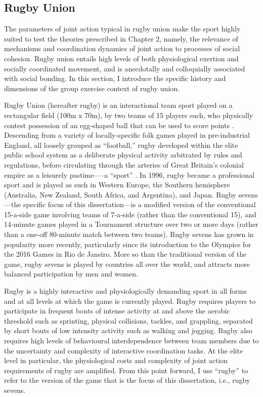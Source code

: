 \begin{CJK}{UTF8}{gbsn}
  \subsection{Rugby Union}

The parameters of joint action typical in rugby union make the sport highly suited to test the theories prescribed in Chapter 2, namely, the relevance of mechanisms and coordination dynamics of joint action to processes of social cohesion.  Rugby union entails high levels of both physiological exertion and socially coordinated movement, and is anecdotally and colloquially associated with social bonding.  In this section, I introduce the specific history and dimensions of the group exercise context of rugby union.

Rugby Union (hereafter rugby) is an interactional team sport played on a rectangular field (100m x 70m), by two teams of 15 players each, who physically contest possession of an egg-shaped ball that can be used to score points \citep{IRB2014}.  Descending from a variety of locally-specific folk games played in pre-industrial England, all loosely grouped as ``football,'' rugby developed within the elite public school system as a deliberate physical activity arbitrated by rules and regulations, before circulating through the arteries of Great Britain's colonial empire as a leisurely pastime—--a ``sport'' \citep{Dunning2005}.  In 1996, rugby became a professional sport and is played as such in Western Europe, the Southern hemisphere (Australia, New Zealand, South Africa, and Argentina), and Japan. Rugby sevens---the specific focus of this dissertation---is a modified version of the conventional 15-a-side game involving teams of 7-a-side (rather than the conventional 15), and 14-minute games played in a Tournament structure over two or more days (rather than a one-off 80-minute match between two teams).  Rugby sevens has grown in popularity more recently, particularly since its introduction to the Olympics for the 2016 Games in Rio de Janeiro.  More so than the traditional version of the game, rugby sevens is played by countries all over the world, and attracts more balanced participation by men and women.

Rugby is a highly interactive and physiologically demanding sport in all forms and at all levels at which the game is currently played. Rugby requires players to participate in frequent bouts of intense activity at and above the aerobic threshold such as sprinting, physical collisions, tackles, and grappling, separated by short bouts of low intensity activity such as walking and jogging.  Rugby also requires high levels of behavioural interdependence between team members due to the uncertainty and complexity of interactive coordination tasks.  At the elite level in particular, the physiological costs and complexity of joint action requirements of rugby are amplified. From this point forward, I use ``rugby'' to refer to the version of the game that is the focus of this dissertation, i.e., rugby sevens.



\end{CJK}
